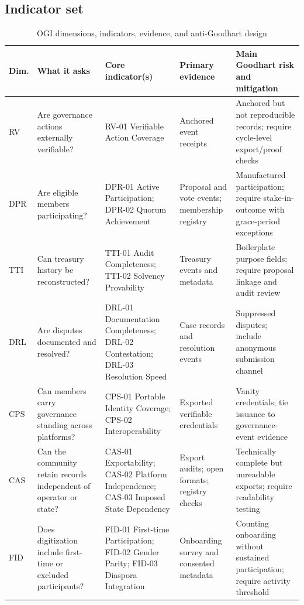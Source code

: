 \documentclass[sigconf]{acmart}
\begin{document}
\subsection{Indicator set}

\begin{table}[t]
\caption{OGI dimensions, indicators, evidence, and anti-Goodhart design}
\label{tab:ogi}
\small
\begin{tabularx}{\textwidth}{>{\raggedright\arraybackslash}p{0.7cm} >{\raggedright\arraybackslash}p{2.6cm} >{\raggedright\arraybackslash}p{3.2cm} >{\raggedright\arraybackslash}p{2.7cm} Y}
\toprule
Dim. & What it asks & Core indicator(s) & Primary evidence & Main Goodhart risk and mitigation \\
\midrule
RV & Are governance actions externally verifiable? & RV-01 Verifiable Action Coverage & Anchored event receipts & Anchored but not reproducible records; require cycle-level export/proof checks \\
DPR & Are eligible members participating? & DPR-01 Active Participation; DPR-02 Quorum Achievement & Proposal and vote events; membership registry & Manufactured participation; require stake-in-outcome with grace-period exceptions \\
TTI & Can treasury history be reconstructed? & TTI-01 Audit Completeness; TTI-02 Solvency Provability & Treasury events and metadata & Boilerplate purpose fields; require proposal linkage and audit review \\
DRL & Are disputes documented and resolved? & DRL-01 Documentation Completeness; DRL-02 Contestation; DRL-03 Resolution Speed & Case records and resolution events & Suppressed disputes; include anonymous submission channel \\
CPS & Can members carry governance standing across platforms? & CPS-01 Portable Identity Coverage; CPS-02 Interoperability & Exported verifiable credentials & Vanity credentials; tie issuance to governance-event evidence \\
CAS & Can the community retain records independent of operator or state? & CAS-01 Exportability; CAS-02 Platform Independence; CAS-03 Imposed State Dependency & Export audits; open formats; registry checks & Technically complete but unreadable exports; require readability testing \\
FID & Does digitization include first-time or excluded participants? & FID-01 First-time Participation; FID-02 Gender Parity; FID-03 Diaspora Integration & Onboarding survey and consented metadata & Counting onboarding without sustained participation; require activity threshold \\
\bottomrule
\end{tabularx}
\end{table}
\end{document}
